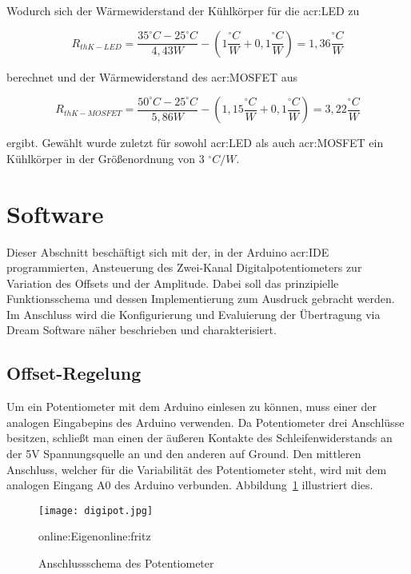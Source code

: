 Wodurch sich der Wärmewiderstand der Kühlkörper für die \gls{acr:LED} zu

\begin{equation}
	\label{equ:thermo2}
	R_{thK-LED} = \frac{35 ^\circ C - 25 ^\circ C}{4,43W}-(1 \frac{^\circ C}{W}+0,1 \frac{^\circ C}{W}) = 1,36\frac{^\circ C}{W}
\end{equation}

berechnet und der Wärmewiderstand des \gls{acr:MOSFET} aus
 
\begin{equation}
	\label{equ:thermo3}
	R_{thK-MOSFET} = \frac{50 ^\circ C - 25 ^\circ C}{5,86W}-(1,15 \frac{^\circ C}{W}+0,1 \frac{^\circ C}{W}) = 3,22\frac{^\circ C}{W}
\end{equation}

ergibt. Gewählt wurde zuletzt für sowohl \gls{acr:LED} als auch \gls{acr:MOSFET} ein Kühlkörper in der Größenordnung von 3 $^\circ C/W$.

\newpage
\section{Software}
\label{sec:Software}

Dieser Abschnitt beschäftigt sich mit der, in der Arduino \gls{acr:IDE} programmierten, Ansteuerung des Zwei-Kanal Digitalpotentiometers zur Variation des Offsets und der Amplitude. Dabei soll das prinzipielle Funktionsschema und dessen Implementierung zum Ausdruck gebracht werden. Im Anschluss wird die Konfigurierung und Evaluierung der Übertragung via Dream Software näher beschrieben und charakterisiert.

\subsection{Offset-Regelung}
\label{subsec:offset}
Um ein Potentiometer mit dem Arduino einlesen zu können, muss einer der analogen Eingabepins des Arduino verwenden. Da Potentiometer drei Anschlüsse besitzen, schließt man einen der äußeren Kontakte des Schleifenwiderstands an der 5V Spannungsquelle an und den anderen auf Ground. Den mittleren Anschluss, welcher für die Variabilität des Potentiometer steht, wird mit dem analogen Eingang A0 des Arduino verbunden. Abbildung~\ref{fig:digipot} illustriert dies. 

\begin{figure}[H]
	\centering
	\texttt{[image: digipot.jpg]}
	\caption[Anschlussschema des Potentiometer]{Anschlussschema des Potentiometer} 
	\gls{online:Eigen}\gls{online:fritz}
	\label{fig:digipot}
\end{figure}

